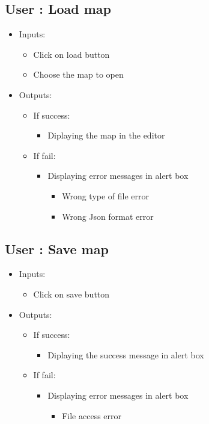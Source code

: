 \subsection{User : Load map}
	\begin{itemize}
	
	
		\item Inputs:
			\begin{itemize}
				\item Click on load button
				\item Choose the map to open
			\end{itemize}
			\item Outputs:
				\begin{itemize}
					\item If success:					
					\begin{itemize}
						\item Diplaying the map in the editor
					\end{itemize}
					\item If fail:
					\begin{itemize}
					\item Displaying error messages in alert box
					\begin{itemize}
						\item Wrong type of file error
						\item Wrong Json format error
					\end{itemize}
					\end{itemize}
				\end{itemize}
	\end{itemize}
	
\subsection{User : Save map}
	\begin{itemize}
	
	
		\item Inputs:
			\begin{itemize}
				\item Click on save button
			\end{itemize}
			\item Outputs:
				\begin{itemize}
					\item If success:					
					\begin{itemize}
						\item Diplaying the success message in alert box
					\end{itemize}
					\item If fail:
					\begin{itemize}
					\item Displaying error messages in alert box
					\begin{itemize}
						\item File access error
					\end{itemize}
					\end{itemize}
				\end{itemize}
	\end{itemize}
	
